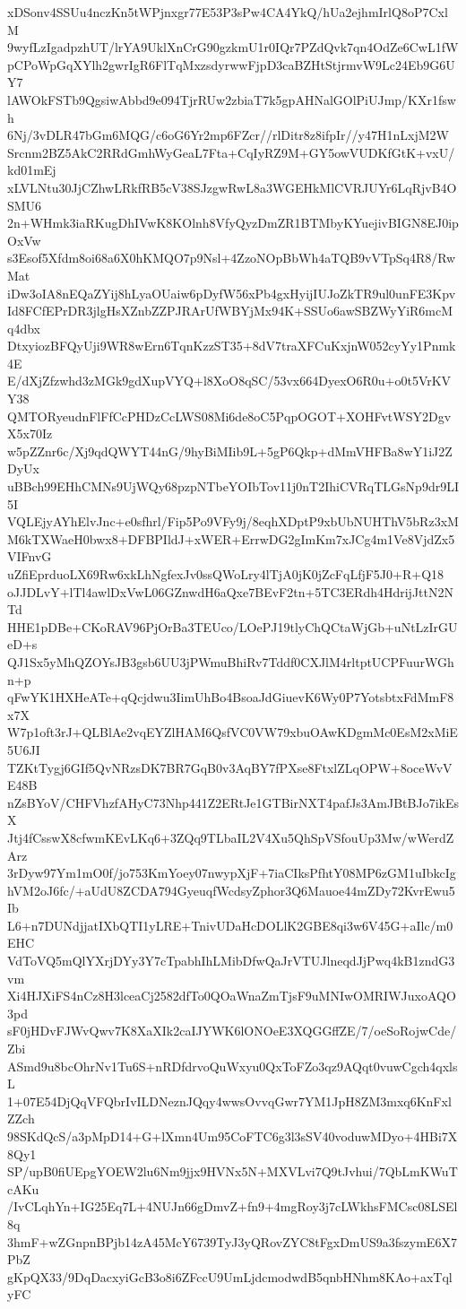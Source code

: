 xDSonv4SSUu4nczKn5tWPjnxgr77E53P3sPw4CA4YkQ/hUa2ejhmIrlQ8oP7CxlM
9wyfLzIgadpzhUT/lrYA9UklXnCrG90gzkmU1r0IQr7PZdQvk7qn4OdZe6CwL1fW
pCPoWpGqXYlh2gwrIgR6FlTqMxzsdyrwwFjpD3caBZHtStjrmvW9Lc24Eb9G6UY7
lAWOkFSTb9QgsiwAbbd9e094TjrRUw2zbiaT7k5gpAHNalGOlPiUJmp/KXr1fswh
6Nj/3vDLR47bGm6MQG/c6oG6Yr2mp6FZcr//rlDitr8z8ifpIr//y47H1nLxjM2W
Srcnm2BZ5AkC2RRdGmhWyGeaL7Fta+CqIyRZ9M+GY5owVUDKfGtK+vxU/kd01mEj
xLVLNtu30JjCZhwLRkfRB5cV38SJzgwRwL8a3WGEHkMlCVRJUYr6LqRjvB4OSMU6
2n+WHmk3iaRKugDhIVwK8KOlnh8VfyQyzDmZR1BTMbyKYuejivBIGN8EJ0ipOxVw
s3Esof5Xfdm8oi68a6X0hKMQO7p9Nsl+4ZzoNOpBbWh4aTQB9vVTpSq4R8/RwMat
iDw3oIA8nEQaZYij8hLyaOUaiw6pDyfW56xPb4gxHyijIUJoZkTR9ul0unFE3Kpv
Id8FCfEPrDR3jlgHsXZnbZZPJRArUfWBYjMx94K+SSUo6awSBZWyYiR6mcMq4dbx
DtxyiozBFQyUji9WR8wErn6TqnKzzST35+8dV7traXFCuKxjnW052cyYy1Pnmk4E
E/dXjZfzwhd3zMGk9gdXupVYQ+l8XoO8qSC/53vx664DyexO6R0u+o0t5VrKVY38
QMTORyeudnFlFfCcPHDzCcLWS08Mi6de8oC5PqpOGOT+XOHFvtWSY2DgvX5x70Iz
w5pZZnr6c/Xj9qdQWYT44nG/9hyBiMIib9L+5gP6Qkp+dMmVHFBa8wY1iJ2ZDyUx
uBBch99EHhCMNs9UjWQy68pzpNTbeYOIbTov11j0nT2IhiCVRqTLGsNp9dr9LI5I
VQLEjyAYhElvJnc+e0sfhrl/Fip5Po9VFy9j/8eqhXDptP9xbUbNUHThV5bRz3xM
M6kTXWaeH0bwx8+DFBPIldJ+xWER+ErrwDG2gImKm7xJCg4m1Ve8VjdZx5VIFnvG
uZfiEprduoLX69Rw6xkLhNgfexJv0ssQWoLry4lTjA0jK0jZcFqLfjF5J0+R+Q18
oJJDLvY+lTl4awlDxVwL06GZnwdH6aQxe7BEvF2tn+5TC3ERdh4HdrijJttN2NTd
HHE1pDBe+CKoRAV96PjOrBa3TEUco/LOePJ19tlyChQCtaWjGb+uNtLzIrGUeD+s
QJ1Sx5yMhQZOYsJB3gsb6UU3jPWmuBhiRv7Tddf0CXJlM4rltptUCPFuurWGhn+p
qFwYK1HXHeATe+qQcjdwu3IimUhBo4BsoaJdGiuevK6Wy0P7YotsbtxFdMmF8x7X
W7p1oft3rJ+QLBlAe2vqEYZlHAM6QsfVC0VW79xbuOAwKDgmMc0EsM2xMiE5U6JI
TZKtTygj6GIf5QvNRzsDK7BR7GqB0v3AqBY7fPXse8FtxlZLqOPW+8oceWvVE48B
nZsBYoV/CHFVhzfAHyC73Nhp441Z2ERtJe1GTBirNXT4pafJs3AmJBtBJo7ikEsX
Jtj4fCsswX8cfwmKEvLKq6+3ZQq9TLbaIL2V4Xu5QhSpVSfouUp3Mw/wWerdZArz
3rDyw97Ym1mO0f/jo753KmYoey07nwypXjF+7iaCIksPfhtY08MP6zGM1uIbkcIg
hVM2oJ6fc/+aUdU8ZCDA794GyeuqfWcdsyZphor3Q6Mauoe44mZDy72KvrEwu5Ib
L6+n7DUNdjjatIXbQTI1yLRE+TnivUDaHcDOLlK2GBE8qi3w6V45G+aIlc/m0EHC
VdToVQ5mQlYXrjDYy3Y7cTpabhIhLMibDfwQaJrVTUJlneqdJjPwq4kB1zndG3vm
Xi4HJXiFS4nCz8H3lceaCj2582dfTo0QOaWnaZmTjsF9uMNIwOMRIWJuxoAQO3pd
sF0jHDvFJWvQwv7K8XaXIk2caIJYWK6lONOeE3XQGGffZE/7/oeSoRojwCde/Zbi
ASmd9u8bcOhrNv1Tu6S+nRDfdrvoQuWxyu0QxToFZo3qz9AQqt0vuwCgch4qxlsL
1+07E54DjQqVFQbrIvILDNeznJQqy4wwsOvvqGwr7YM1JpH8ZM3mxq6KnFxlZZch
98SKdQcS/a3pMpD14+G+lXmn4Um95CoFTC6g3l3sSV40voduwMDyo+4HBi7X8Qy1
SP/upB0fiUEpgYOEW2lu6Nm9jjx9HVNx5N+MXVLvi7Q9tJvhui/7QbLmKWuTcAKu
/IvCLqhYn+IG25Eq7L+4NUJn66gDmvZ+fn9+4mgRoy3j7cLWkhsFMCsc08LSEl8q
3hmF+wZGnpnBPjb14zA45McY6739TyJ3yQRovZYC8tFgxDmUS9a3fszymE6X7PbZ
gKpQX33/9DqDacxyiGcB3o8i6ZFccU9UmLjdcmodwdB5qnbHNhm8KAo+axTqlyFC

